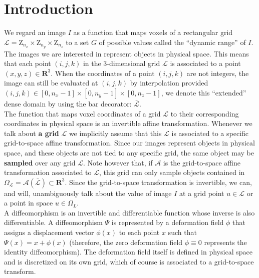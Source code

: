\section{Introduction}

We regard an image $I$ as a function that maps voxels of a rectangular grid \hbox{$\mathcal{L} = \mathrm{Z}_{n_{x}} \times \mathrm{Z}_{n_{y}} \times \mathrm{Z}_{n_{z}}$} to a set $G$ of
possible values called the ``dynamic range'' of $I$. The images we are interested in represent objects in physical space. This means that each point $(i,j,k)$ in the
3-dimensional grid $\mathcal{L}$ is associated to a point $(x,y,z) \in \mathbf{R}^{3}$. When the coordinates of a point
\hbox{$(i,j,k)$} are not integers, the image can still be evaluated at $(i, j, k)$ by interpolation provided
\hbox{$(i,j,k) \in \left[0, n_{x}-1\right] \times \left[0, n_{y}-1\right] \times \left[0, n_{z}-1\right]$}, we denote this ``extended'' dense domain by using the bar decorator:
$\bar{\mathcal{L}}$.\\

The function that maps voxel coordinates of a grid $\mathcal{L}$ to their corresponding coordinates in physical space is an invertible affine transformation. Whenever we talk about
\textbf{a grid} $\mathcal{L}$ we implicitly assume that this $\mathcal{L}$ is associated to a specific grid-to-space affine transformation.
Since our images represent objects in physical space, and these objects are not tied to any specific grid, the same object may be \textbf{sampled} over any grid $\mathcal{L}$.
Note however that, if $\mathcal{A}$ is the grid-to-space affine transformation associated to $\mathcal{L}$, this grid can only sample objects contained in
$\Omega_{\mathcal{L}} = \mathcal{A}(\bar{\mathcal{L}}) \subset \mathbf{R}^{3}$. Since the grid-to-space transformation is invertible, we can, and will, unambiguously talk about the
value of image $I$ at a grid point $u\in \mathcal{L}$ or a point in space $u \in \Omega_{L}$.\\

A diffeomorphism is an invertible and differentiable function whose inverse is also differentiable. A diffeomorphism $\Psi$ is represented by a
deformation field $\phi$ that assigns a displacement vector $\phi(x)$ to each point $x$ such that $\Psi(x) = x + \phi(x)$ (therefore, the zero deformation field $\phi \equiv 0$
represents the identity diffeomorphism). The deformation field itself is defined in physical space and is discretized on its own grid, which of course is associated to
a grid-to-space transform.\\

